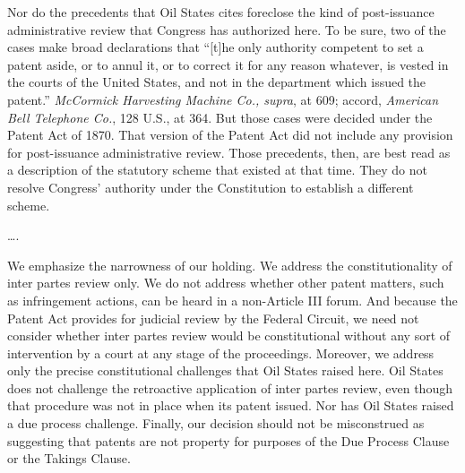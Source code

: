 Nor do the precedents that Oil States cites foreclose the kind of
post-issuance administrative review that Congress has authorized here. To be
sure, two of the cases make broad declarations that ``[t]he only authority
competent to set a patent aside, or to annul it, or to correct it for any reason
whatever, is vested in the courts of the United States, and not in the
department which issued the patent.'' \textit{McCormick Harvesting Machine Co.,
supra}, at 609; accord, \textit{American Bell Telephone Co.}, 128
U.S., at 364. But those cases were decided under the Patent Act of
1870.
That version of the Patent Act did not
include any provision for post-issuance administrative review. Those precedents,
then, are best read as a description of the statutory scheme that existed at
that time. They do not resolve Congress' authority under the Constitution to
establish a different scheme.

\ldots.


We emphasize the narrowness of our holding. We address the constitutionality of
inter partes review only. We do not address whether other patent matters, such
as infringement actions, can be heard in a non-Article III forum. And because
the Patent Act provides for judicial review by the Federal Circuit,
we need not consider whether inter partes review would be
constitutional without any sort of intervention by a court at any stage of the
proceedings.
Moreover, we address only the precise constitutional challenges that Oil States
raised here. Oil States does not challenge the retroactive application of inter
partes review, even though that procedure was not in place when its patent
issued. Nor has Oil States raised a due process challenge. Finally, our decision
should not be misconstrued as suggesting that patents are not property for
purposes of the Due Process Clause or the Takings Clause.

